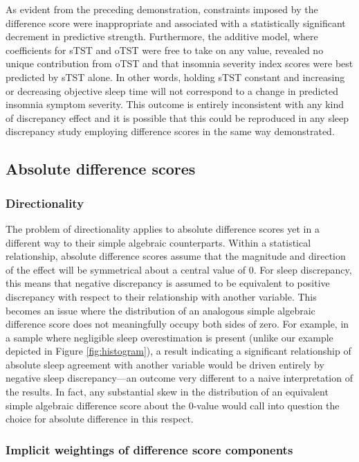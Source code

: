 \documentclass[
]{article}
\begin{document}
As evident from the preceding demonstration, constraints imposed by the difference score were inappropriate and associated with a statistically significant decrement in predictive strength. Furthermore, the additive model, where coefficients for sTST and oTST were free to take on any value, revealed no unique contribution from oTST and that insomnia severity index scores were best predicted by sTST alone. In other words, holding sTST constant and increasing or decreasing objective sleep time will not correspond to a change in predicted insomnia symptom severity. This outcome is entirely inconsistent with any kind of discrepancy effect and it is possible that this could be reproduced in any sleep discrepancy study employing difference scores in the same way demonstrated.

\subsection{Absolute difference scores}\label{absolute-difference-scores}

\subsubsection{Directionality}\label{directionality-1}

The problem of directionality applies to absolute difference scores yet in a different way to their simple algebraic counterparts. Within a statistical relationship, absolute difference scores assume that the magnitude and direction of the effect will be symmetrical about a central value of 0. For sleep discrepancy, this means that negative discrepancy is assumed to be equivalent to positive discrepancy with respect to their relationship with another variable. This becomes an issue where the distribution of an analogous simple algebraic difference score does not meaningfully occupy both sides of zero. For example, in a sample where negligible sleep overestimation is present (unlike our example depicted in Figure \ref{fig:histogram}), a result indicating a significant relationship of absolute sleep agreement with another variable would be driven entirely by negative sleep discrepancy---an outcome very different to a naive interpretation of the results. In fact, any substantial skew in the distribution of an equivalent simple algebraic difference score about the 0-value would call into question the choice for absolute difference in this respect.

\subsubsection{Implicit weightings of difference score components}\label{implicit-weightings-of-difference-score-components}
\end{document}
